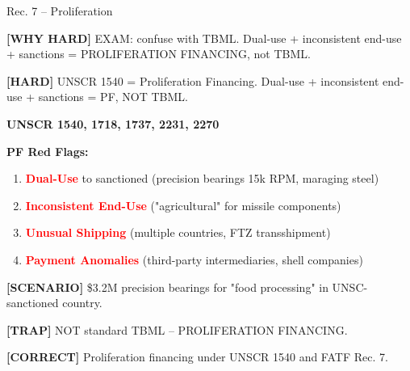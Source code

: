 \documentclass[6pt,aspectratio=169,fontsize=5pt]{beamer}
\renewcommand{\tiny}{\fontsize{3.5pt}{4.5pt}\selectfont}
\renewcommand{\normalsize}{\fontsize{7.5pt}{8.5pt}\selectfont}
\newcommand{\trap}[1]{%
	\begin{block}{\textcolor{redtrap}{\textbf{[TRAP]}}}
		\textcolor{redtrap}{\tiny #1}
	\end{block}
}
\newcommand{\scenario}[1]{%
	\begin{block}{\textbf{[SCENARIO]}}
		\tiny #1
	\end{block}
}
\newcommand{\correct}[1]{%
	\begin{block}{\textcolor{greencorrect}{\textbf{[CORRECT]}}}
		\textcolor{greencorrect}{\tiny #1}
	\end{block}
}
\newcommand{\hard}[1]{%
	\begin{block}{\textcolor{hardcolor}{\textbf{[HARD]}}}
		\textcolor{hardcolor}{\tiny #1}
	\end{block}
}
\newcommand{\hardexplain}[1]{%
	\begin{block}{\textcolor{orangehard}{\textbf{[WHY HARD]}}}
		\textcolor{orangehard}{\tiny #1}
	\end{block}
}
\begin{document}
	\begin{frame}{\normalsize Rec. 7 -- Proliferation}
		
		\hardexplain{EXAM: confuse with TBML. Dual-use + inconsistent end-use + sanctions = PROLIFERATION FINANCING, not TBML.}
		
		\hard{UNSCR 1540 = Proliferation Financing. Dual-use + inconsistent end-use + sanctions = PF, NOT TBML.}
		
		\textbf{UNSCR 1540, 1718, 1737, 2231, 2270}
		
		\textbf{PF Red Flags:}
		\begin{enumerate}
			\item \textcolor{red}{\textbf{Dual-Use}} to sanctioned (precision bearings 15k RPM, maraging steel)
			\item \textcolor{red}{\textbf{Inconsistent End-Use}} ("agricultural" for missile components)
			\item \textcolor{red}{\textbf{Unusual Shipping}} (multiple countries, FTZ transshipment)
			\item \textcolor{red}{\textbf{Payment Anomalies}} (third-party intermediaries, shell companies)
		\end{enumerate}
		
		\scenario{\$3.2M precision bearings for "food processing" in UNSC-sanctioned country.}
		
		\trap{NOT standard TBML -- PROLIFERATION FINANCING.}
		
		\correct{Proliferation financing under UNSCR 1540 and FATF Rec. 7.}
	\end{frame}
	
\end{document}
